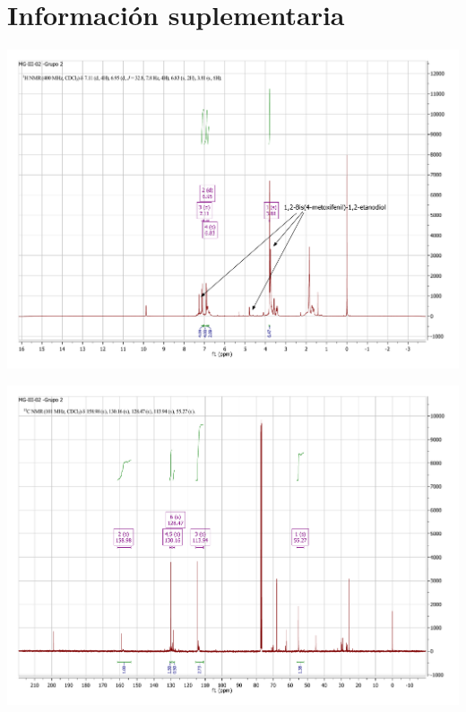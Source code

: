 \documentclass[fleqn,11pt]{SelfArx}
\begin{document}
\section{Informaci\'on suplementaria}\label{sec: complementaria}
{
	\begin{minipage}{0.9\textheight}
		\centering
		\includegraphics[height=0.7\textheight]{RMN/H.pdf}
		\label{HHRM}
	\end{minipage}
}

{
	\begin{minipage}{\textheight}
		\centering
		\includegraphics[height=0.7\textheight]{RMN/C.pdf}
		\label{CHRM}
	\end{minipage}
}
\end{document}
